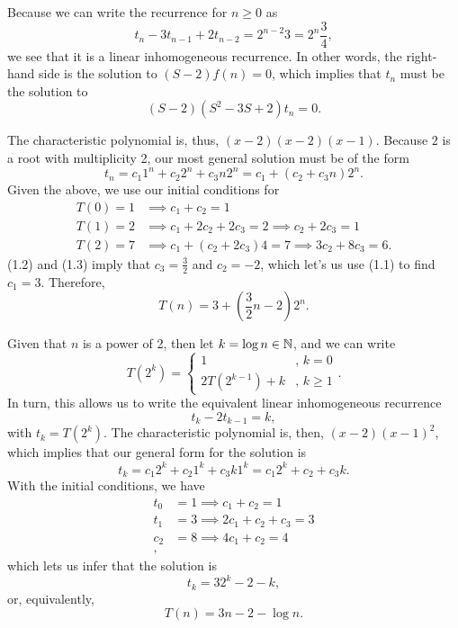  

Because we can write the recurrence for $n\ge 0$ as \[
t_{n} - 3t_{n-1} + 2 t_{n-2} = 2^{n-2}3 = 2^{n} \frac{3}{4}
,\] we see that it is a linear inhomogeneous recurrence.
In other words, the right-hand side is the solution to $(S-2)f(n) = 0$, which implies that $t_n$ must be the solution to \[
    (S-2)(S^2 -3S + 2)t_{n} = 0
.\]

The characteristic polynomial is, thus, $(x-2)(x-2)(x-1)$.
Because $2$ is a root with multiplicity 2, our most general solution must be of the form \[
    t_{n} = c_1 1^{n} + c_2 2^{n} + c_3 n 2^{n} = c_1 + (c_2 + c_3 n)2^{n}
.\]
Given the above, we use our initial conditions for
\begin{align}
    T(0) = 1 &\implies c_1+c_2 = 1 \\
    T(1) = 2 &\implies c_1+ 2c_2 + 2c_3 = 2 \implies c_2+2c_3 = 1 \\
    T(2) = 7 &\implies c_1+ (c_2 + 2c_3)4 = 7 \implies 3c_2 + 8c_3 = 6
.\end{align}
(1.2) and (1.3) imply that $c_3 = \frac{3}{2}$ and $c_2=-2$, which let's us use (1.1) to find $c_1=3$.
Therefore, \[
T(n) = 3 + (\frac{3}{2}n - 2)2^{n}
.\] 


Given that $n$ is a power of 2, then let $k=\log n \in \mathbb{N}$, and we can write \[
    T(2^{k}) = \begin{cases}
	1 &,\, k=0 \\
	2T(2^{k-1}) + k &,\,k\ge 1
    \end{cases}
.\] 
In turn, this allows us to write the equivalent linear inhomogeneous recurrence \[
t_k - 2t_{k-1} = k
,\] with $t_k = T(2^{k})$.
The characteristic polynomial is, then, $(x-2)(x-1)^2$, which implies that our general form for the solution is  \[
t_k = c_1 2^{k} + c_2 1^{k} + c_3 k 1^{k} = c_1 2^{k} + c_2 + c_3 k
.\] 
With the initial conditions, we have
\begin{align*}
    t_0 &= 1 \implies c_1+c_2=1  \\
    t_1 &= 3 \implies 2c_1+c_2+c_3 = 3 \\
    c_2 &= 8 \implies 4c_1 + c_2 = 4 \\
,\end{align*}
which lets us infer that the solution is \[
    t_k = 3 2^{k} -2 - k
,\] or, equivalently, \[
    T(n) = 3n - 2 - \log n
.\] 


